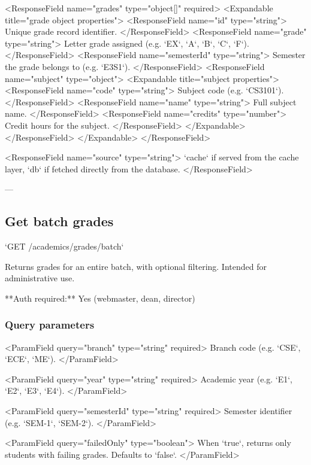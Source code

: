 <ResponseField name="grades" type="object[]" required>
  <Expandable title="grade object properties">
    <ResponseField name="id" type="string">
      Unique grade record identifier.
    </ResponseField>
    <ResponseField name="grade" type="string">
      Letter grade assigned (e.g. `EX`, `A`, `B`, `C`, `F`).
    </ResponseField>
    <ResponseField name="semesterId" type="string">
      Semester the grade belongs to (e.g. `E3S1`).
    </ResponseField>
    <ResponseField name="subject" type="object">
      <Expandable title="subject properties">
        <ResponseField name="code" type="string">
          Subject code (e.g. `CS3101`).
        </ResponseField>
        <ResponseField name="name" type="string">
          Full subject name.
        </ResponseField>
        <ResponseField name="credits" type="number">
          Credit hours for the subject.
        </ResponseField>
      </Expandable>
    </ResponseField>
  </Expandable>
</ResponseField>

<ResponseField name="source" type="string">
  `cache` if served from the cache layer, `db` if fetched directly from the
  database.
</ResponseField>

---

\subsection{Get batch grades}

`GET /academics/grades/batch`

Returns grades for an entire batch, with optional filtering. Intended for administrative use.

**Auth required:** Yes (webmaster, dean, director)

\subsubsection{Query parameters}

<ParamField query="branch" type="string" required>
  Branch code (e.g. `CSE`, `ECE`, `ME`).
</ParamField>

<ParamField query="year" type="string" required>
  Academic year (e.g. `E1`, `E2`, `E3`, `E4`).
</ParamField>

<ParamField query="semesterId" type="string" required>
  Semester identifier (e.g. `SEM-1`, `SEM-2`).
</ParamField>

<ParamField query="failedOnly" type="boolean">
  When `true`, returns only students with failing grades. Defaults to `false`.
</ParamField>

